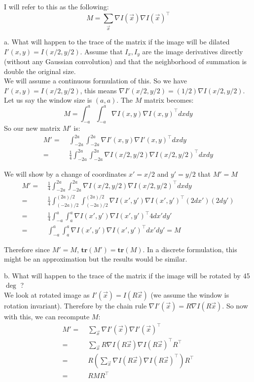 \documentclass[11pt,english]{article}
\begin{document}
\begin{enumerate}
I will refer to this as the following:
\[
    M = \sum_{\vec{x}} \nabla I(\vec{x}) \nabla I(\vec{x})^\top 
\]

a. What will happen to the trace of the matrix if the image will be dilated $I'(x,y) = I(x/2,y/2)$.
Assume that $I_x,I_y$ are the image derivatives directly (without any Gaussian convolution) and that the neighborhood of summation is double the original size. 
\\
We will assume a continuous formulation of this. So we have $I'(x,y) = I(x/2,y/2)$, this means
$\nabla I'(x/2,y/2) = (1/2) \nabla I(x/2,y/2)$. Let us say the window size is $(a,a)$.
The $M$ matrix becomes:
\[ M = \int_{-a}^{a} \int_{-a}^{a} \nabla I(x,y) \nabla I(x,y)^\top dx dy \]
So our new matrix $M'$ is:
\begin{align*}
M' =&\; \int_{-2a}^{2a} \int_{-2a}^{2a} \nabla I'(x,y) \nabla I'(x,y)^\top dx dy \\
   =&\; \frac{1}{4} \int_{-2a}^{2a} \int_{-2a}^{2a} \nabla I(x/2,y/2) \nabla I(x/2,y/2)^\top dx dy 
\end{align*}

We will show by a change of coordinates $x' = x/2$ and $y' = y/2$ that $M' = M$
\begin{align*}
M' =&\; \frac{1}{4} \int_{-2a}^{2a} \int_{-2a}^{2a} \nabla I(x/2,y/2) \nabla I(x/2,y/2)^\top dx dy \\
    =&\; \frac{1}{4} \int_{(-2a)/2}^{(2a)/2} \int_{(-2a)/2}^{(2a)/2} \nabla I(x',y') \nabla I(x',y')^\top (2dx') (2dy') \\
    =&\; \frac{1}{4} \int_{-a}^{a} \int_{a}^{a} \nabla I(x',y') \nabla I(x',y')^\top 4 dx' dy' \\
    =&\; \int_{-a}^{a} \int_{a}^{a} \nabla I(x',y') \nabla I(x',y')^\top dx' dy' = M
\end{align*}

Therefore since $M'=M$, $\mathbf{tr}(M') = \mathbf{tr}(M)$. In a discrete formulation, this might be an approximation
but the results would be similar.

b. What will happen to the trace of the matrix if the image will be rotated by 45$\deg$ ?
\\
We look at rotated image as $I'(\vec{x}) = I(R\vec{x})$ (we assume the window is rotation invariant).
Therefore by the chain rule
$\nabla I'(\vec{x}) = R \nabla I(R\vec{x})$. So now with this, we can recompute $M$:
\begin{align*}
    M'
    =&\; \sum_{\vec{x}} \nabla I'(\vec{x}) \nabla I'(\vec{x})^\top \\
    =&\; \sum_{\vec{x}} R\nabla I(R\vec{x}) \nabla I(R\vec{x})^\top R^\top \\ 
    =&\; R \left( \sum_{\vec{x}} \nabla I(R\vec{x}) \nabla I(R\vec{x})^\top \right) R^\top \\
    =&\; R M R^\top \\
\end{align*}


\end{enumerate}
\end{document}
